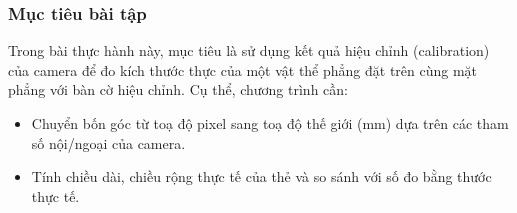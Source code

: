           \subsubsection{Mục tiêu bài tập}
          \hspace*{0.6cm}Trong bài thực hành này, mục tiêu là sử dụng kết quả hiệu chỉnh (calibration) của camera để đo kích thước thực của một vật thể phẳng đặt trên cùng mặt phẳng với bàn cờ hiệu chỉnh. Cụ thể, chương trình cần:
          \begin{itemize}
               \item Chuyển bốn góc từ toạ độ pixel sang toạ độ thế giới (mm) dựa trên các tham số nội/ngoại của camera.
               \item Tính chiều dài, chiều rộng thực tế của thẻ và so sánh với số đo bằng thước thực tế.
          \end{itemize}

